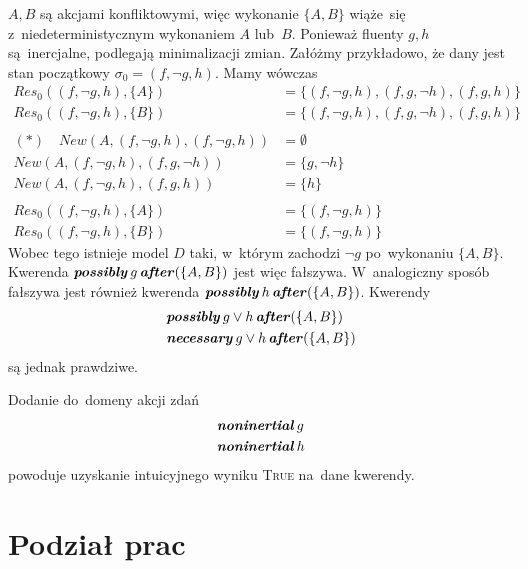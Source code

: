\documentclass[11pt,a4paper]{article}
\DeclareMathOperator{\After}{\textbf{\textit{after}}}
\DeclareMathOperator{\Noninertial}{\textbf{\textit{noninertial}}}
\DeclareMathOperator{\Possibly}{\textbf{\textit{possibly}}}
\DeclareMathOperator{\Necessary}{\textbf{\textit{necessary}}}
\begin{document}
\begin{itemize}
\begin{itemize}
        $A,B$ są akcjami konfliktowymi, więc wykonanie $\{A, B\}$ wiąże~się z~niedeterministycznym wykonaniem $A$ lub~$B$.
        Ponieważ fluenty $g, h$ są~inercjalne, podlegają minimalizacji zmian.
        Załóżmy przykładowo, że dany jest stan początkowy $\sigma_0 = (f, \neg g, h)$.
        Mamy wówczas
        \begin{align*}
            {Res}_0((f, \neg g, h), \{A\}) &= \{ (f, \neg g, h), (f, g, \neg h), (f, g, h) \} \\
            {Res}_0((f, \neg g, h), \{B\}) &= \{ (f, \neg g, h), (f, g, \neg h), (f, g, h) \} \\
            \\
            (*) \quad New(A, (f, \neg g, h), (f, \neg g, h)) &= \emptyset \\
            New(A, (f, \neg g, h), (f, g, \neg h)) &= \{ g, \neg h \} \\
            New(A, (f, \neg g, h), (f, g, h)) &= \{ h \} \\
            \\
            {Res}_0((f, \neg g, h), \{A\}) &= \{ (f, \neg g, h) \} \\
            {Res}_0((f, \neg g, h), \{B\}) &= \{ (f, \neg g, h) \}
        \end{align*}
        Wobec tego istnieje model $D$ taki, w~którym zachodzi $\neg g$ po~wykonaniu $\{ A, B \}$.
        Kwerenda $\Possibly g \After (\{A,B\})$ jest więc fałszywa.
        W~analogiczny sposób fałszywa jest również kwerenda $\Possibly h \After (\{A,B\})$.
        Kwerendy
        \begin{align*}
            & \Possibly g \lor h \After (\{A,B\}) \\
            & \Necessary g \lor h \After (\{A,B\})
        \end{align*}
        są jednak prawdziwe.

        Dodanie do~domeny akcji zdań
        \begin{align*}
            & \Noninertial g \\
            & \Noninertial h
        \end{align*}
        powoduje uzyskanie intuicyjnego wyniku \textsc{True} na~dane kwerendy.
    \end{itemize}
\end{itemize}

\section{Podział prac}
\end{document}
